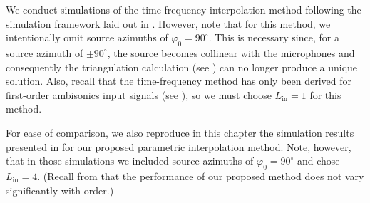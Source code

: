 We conduct simulations of the time-frequency interpolation method following the simulation framework laid out in .
However, note that for this method, we intentionally omit source azimuths of $\varphi_0 = 90^\circ$.
This is necessary since, for a source azimuth of $\pm90^\circ$, the source becomes collinear with the microphones and consequently the triangulation calculation (see ) can no longer produce a unique solution.
Also, recall that the time-frequency method has only been derived for first-order ambisonics input signals (see ), so we must choose $L_\text{in} = 1$ for this method.

For ease of comparison, we also reproduce in this chapter the simulation results presented in  for our proposed parametric interpolation method.
Note, however, that in those simulations we included source azimuths of $\varphi_0 = 90^\circ$ and chose $L_\text{in} = 4$.
(Recall from  that the performance of our proposed method does not vary significantly with order.)